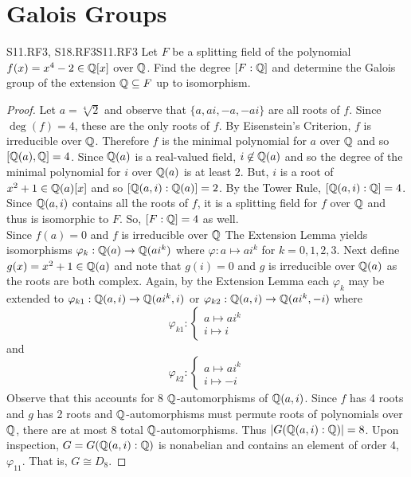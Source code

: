 \documentclass[../AlgebraQualSolutions.tex]{subfiles}
\begin{document}
\section{Galois Groups}

\begin{prob}{S11.RF3, S18.RF3}{S11.RF3}
    Let $F$ be a splitting field of the polynomial $f(x) = x^4 - 2 \in \mathbb{Q}[x]$ over $\mathbb{Q}$. Find the degree $[F: \mathbb{Q}]$ and determine the Galois group of the extension $\mathbb{Q} \subseteq F$ up to isomorphism.
\end{prob}

\begin{proof}
    Let $a = \sqrt[4]{2}$ and  observe that $\{a,ai,-a,-ai\}$ are all roots of $f$. Since $\deg(f) = 4$, these are the only roots of $f$. By Eisenstein's Criterion, $f$ is irreducible over $\mathbb{Q}$. Therefore $f$ is the minimal polynomial for $a$ over $\mathbb{Q}$ and so $[\mathbb{Q}(a),\mathbb{Q}] = 4$. Since $\mathbb{Q}(a)$ is a real-valued field, $i \not\in \mathbb{Q}(a)$ and so the degree of the minimal polynomial for $i$ over $\mathbb{Q}(a)$ is at least 2. But, $i$ is a root of $x^2 + 1 \in \mathbb{Q}(a)[x]$ and so $[\mathbb{Q}(a,i): \mathbb{Q}(a)] = 2$. By the Tower Rule, $[\mathbb{Q}(a,i): \mathbb{Q}] = 4$. Since $\mathbb{Q}(a,i)$ contains all the roots of $f$, it is a splitting field for $f$ over $\mathbb{Q}$ and thus is isomorphic to $F$. So, $[F: \mathbb{Q}] = 4$ as well.\\

    Since $f(a) = 0$ and $f$ is irreducible over $\mathbb{Q}$ The Extension Lemma yields isomorphisms $\varphi_k: \mathbb{Q}(a) \to \mathbb{Q}(ai^k)$ where $\varphi:a \mapsto ai^k$ for $k = 0,1,2,3$. Next define $g(x) = x^2 + 1 \in \mathbb{Q}(a)$ and note that $g(i) = 0$ and $g$ is irreducible over $\mathbb{Q}(a)$ as the roots are both complex. Again, by the Extension Lemma each $\varphi_k$ may be extended to $\varphi_{k1}: \mathbb{Q}(a,i) \to \mathbb{Q}(ai^k, i)$ or $\varphi_{k2}: \mathbb{Q}(a,i) \to \mathbb{Q}(ai^k,-i)$ where
        \[\varphi_{k1}: \begin{cases}
            a \mapsto ai^k\\
            i \mapsto i
        \end{cases}\]
    and
        \[\varphi_{k2}: \begin{cases}
        a \mapsto ai^k\\
        i \mapsto -i
    \end{cases}\]
    Observe that this accounts for 8 $\mathbb{Q}$-automorphisms of $\mathbb{Q}(a,i)$. Since $f$ has 4 roots and $g$ has 2 roots and $\mathbb{Q}$-automorphisms must permute roots of polynomials over $\mathbb{Q}$, there are at most 8 total $\mathbb{Q}$-automorphisms. Thus $|G(\mathbb{Q}(a,i): \mathbb{Q})| = 8$. Upon inspection, $G = G(\mathbb{Q}(a,i): \mathbb{Q})$ is nonabelian and contains an element of order 4, $\varphi_{11}$. That is, $G \cong D_8$. 
\end{proof}
\end{document}
